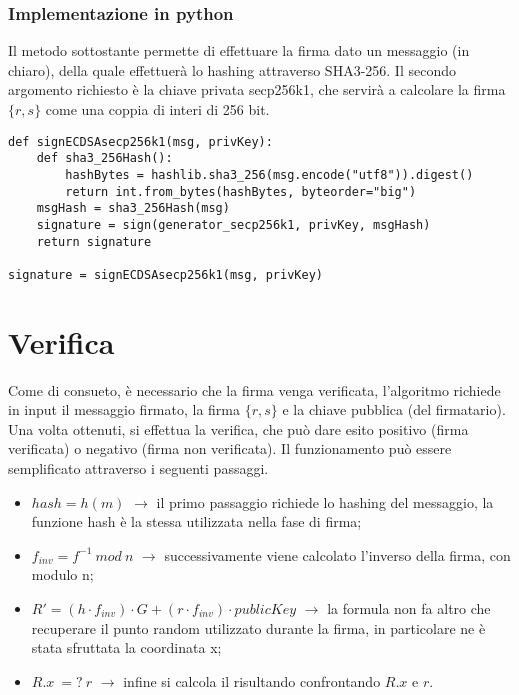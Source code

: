\subsubsection{Implementazione in python}

Il metodo sottostante permette di effettuare la firma dato un messaggio (in chiaro), della quale effettuerà lo hashing attraverso SHA3-256. 
Il secondo argomento richiesto è la chiave privata secp256k1, che servirà a calcolare la firma $\{r, s\}$ come una coppia di interi di 256 bit. 

\begin{lstlisting}
def signECDSAsecp256k1(msg, privKey):
	def sha3_256Hash():
		hashBytes = hashlib.sha3_256(msg.encode("utf8")).digest()
		return int.from_bytes(hashBytes, byteorder="big")
	msgHash = sha3_256Hash(msg)
	signature = sign(generator_secp256k1, privKey, msgHash)
	return signature

signature = signECDSAsecp256k1(msg, privKey)
\end{lstlisting}

\newpage

\section{Verifica}

Come di consueto, è necessario che la firma venga verificata, l'algoritmo richiede in input il messaggio firmato, la firma $\{r, s\}$ e la chiave pubblica (del firmatario). Una volta ottenuti, si effettua la verifica, che può dare esito positivo (firma verificata) o negativo (firma non verificata). Il funzionamento può essere semplificato attraverso i seguenti passaggi.

\begin{itemize}
	\item $hash = h(m)$ $\rightarrow$ il primo passaggio richiede lo hashing del messaggio, la funzione hash è la stessa utilizzata nella fase di firma;
	\item $f_{inv} = f^{-1} \: mod \: n$ $\rightarrow$ successivamente viene calcolato l'inverso della firma, con modulo n;
	\item $R' = (h \cdot f_{inv}) \cdot G + (r \cdot f_{inv}) \cdot publicKey$ $\rightarrow$ la formula non fa altro che recuperare il punto random utilizzato durante la firma, in particolare ne è stata sfruttata la coordinata x;
	\item $R.x \: =? \: r$ $\rightarrow$ infine si calcola il risultando confrontando $R.x$ e $r$.
\end{itemize}

